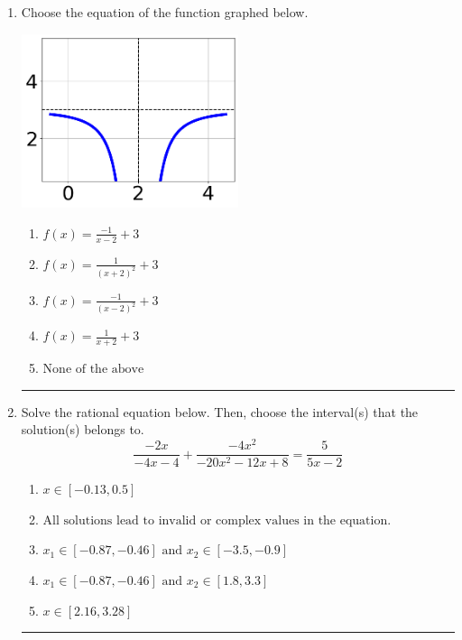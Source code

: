 \documentclass[14pt]{extbook}
\newcommand{\litem}[1]{\item#1\hspace*{-1cm}\rule{\textwidth}{0.4pt}}
\begin{document}
\begin{enumerate}
{\begin{enumerate}[label=\Alph*.]
\end{enumerate} }
\litem{
Choose the equation of the function graphed below.
\begin{center}
    \includegraphics[width=0.5\textwidth]{../Figures/rationalGraphToEquationB.png}
\end{center}
\begin{enumerate}[label=\Alph*.]
\item \( f(x) = \frac{-1}{x - 2} + 3 \)
\item \( f(x) = \frac{1}{(x + 2)^2} + 3 \)
\item \( f(x) = \frac{-1}{(x - 2)^2} + 3 \)
\item \( f(x) = \frac{1}{x + 2} + 3 \)
\item \( \text{None of the above} \)

\end{enumerate} }
\litem{
Solve the rational equation below. Then, choose the interval(s) that the solution(s) belongs to.\[ \frac{-2x}{-4x -4} + \frac{-4x^{2}}{-20x^{2} -12 x + 8} = \frac{5}{5x -2} \]\begin{enumerate}[label=\Alph*.]
\item \( x \in [-0.13,0.5] \)
\item \( \text{All solutions lead to invalid or complex values in the equation.} \)
\item \( x_1 \in [-0.87, -0.46] \text{ and } x_2 \in [-3.5,-0.9] \)
\item \( x_1 \in [-0.87, -0.46] \text{ and } x_2 \in [1.8,3.3] \)
\item \( x \in [2.16,3.28] \)


\end{enumerate}}
\end{enumerate}
\end{document}
